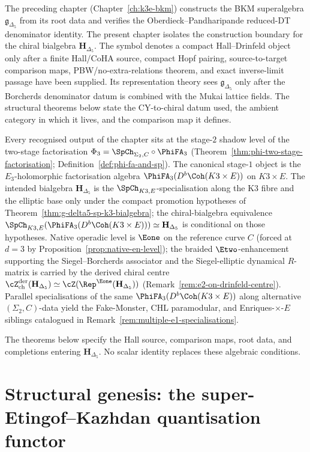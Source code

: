 The preceding chapter (Chapter~\ref{ch:k3e-bkm}) constructs the BKM superalgebra
$\mathfrak{g}_{\Delta_5}$ from its root data and verifies the
Oberdieck--Pandharipande reduced-DT denominator identity. The present chapter
isolates the construction boundary for the chiral bialgebra
$\mathbf{H}_{\Delta_5}$.  The symbol denotes a compact Hall--Drinfeld
object only after a finite Hall/CoHA source, compact Hopf pairing,
source-to-target comparison maps, PBW/no-extra-relations theorem, and exact
inverse-limit passage have been supplied.  Its representation theory sees
$\mathfrak{g}_{\Delta_5}$ only after the Borcherds denominator datum is
combined with the Mukai lattice fields. The structural theorems below state
the CY-to-chiral datum used, the ambient category in which it lives, and the
comparison map it defines.

Every recognised output of the chapter sits at the stage-$2$ shadow level of
the two-stage factorisation $\Phi_3 = \SpCh_{\Sigma_2, C} \circ
\PhiFA_3$ (Theorem~\ref{thm:phi-two-stage-factorisation};
Definition~\ref{def:phi-fa-and-sp}). The canonical stage-$1$ object is
the $E_3$-holomorphic factorisation algebra
$\PhiFA_3(D^b\Coh(K3 \times E))$ on $K3 \times E$.  The intended bialgebra
$\mathbf{H}_{\Delta_5}$ is the $\SpCh_{K3, E}$-specialisation along the
K3 fibre and the elliptic base only under the compact promotion hypotheses
of Theorem~\ref{thm:g-delta5-sp-k3-bialgebra}; the chiral-bialgebra equivalence
$\SpCh_{K3, E}(\PhiFA_3(D^b\Coh(K3 \times E))) \simeq \mathbf{H}_{\Delta_5}$
is conditional on those hypotheses. Native operadic level is $\Eone$ on the
reference curve $C$ (forced at $d = 3$ by
Proposition~\ref{prop:native-en-level}); the braided $\Etwo$-enhancement
supporting the Siegel--Borcherds associator and the Siegel-elliptic
dynamical $R$-matrix is carried by the derived chiral centre
$\cZ^{\mathrm{der}}_{\mathrm{ch}}(\mathbf{H}_{\Delta_5})
\simeq \cZ(\Rep^{\Eone}(\mathbf{H}_{\Delta_5}))$
(Remark~\ref{rem:e2-on-drinfeld-centre}).
Parallel specialisations of the same $\PhiFA_3(D^b\Coh(K3 \times E))$
along alternative $(\Sigma_2, C)$-data yield the Fake-Monster, CHL
paramodular, and Enriques-$\times$-$E$ siblings catalogued in
Remark~\ref{rem:multiple-e1-specialisations}.

The theorems below specify the Hall source, comparison maps, root data,
and completions entering $\mathbf{H}_{\Delta_5}$. No scalar identity
replaces these algebraic conditions.

\section{Structural genesis: the super-Etingof--Kazhdan quantisation functor}
\label{sec:k3-structural-genesis}

